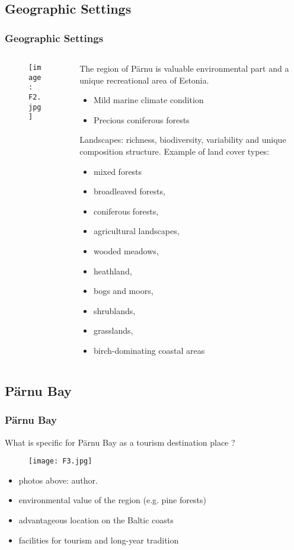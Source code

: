 \documentclass[pdflatex,compress,8pt,
	xcolor={dvipsnames,dvipsnames,svgnames,x11names,table},
]{beamer}
\begin{document}
\subsection{Geographic Settings}
\begin{frame}\frametitle{Geographic Settings}
\begin{minipage}[0.4\textheight]{\textwidth}
\begin{columns}[T]
\begin{column}{0.4\textwidth}
\begin{figure}[H]
	\centering
		\texttt{[image: F2.jpg]}
\end{figure}
\end{column}
%
\begin{column}{0.6\textwidth}
The region of Pärnu is valuable environmental part and a \\
unique recreational area of Estonia. 
\begin{itemize}
	\item Mild marine climate condition
	\item Precious coniferous forests
\end{itemize}
Landscapes: richness, biodiversity, variability and unique composition structure.
Example of land cover types:
\begin{itemize}
	\item mixed forests
	\item broadleaved forests,
	\item coniferous forests,
	\item agricultural landscapes, 
	\item wooded meadows,
	\item heathland, 
	\item bogs and moors,
	\item shrublands,
	\item grasslands, 
	\item birch-dominating coastal areas
\end{itemize}
\end{column}
\end{columns}
\end{minipage}
\end{frame} 

\subsection{Pärnu Bay}
\begin{frame}\frametitle{Pärnu Bay}
 What is specific for Pärnu Bay as a tourism destination place ?
\begin{figure}[H]
	\centering
		\texttt{[image: F3.jpg]}
\end{figure}
\begin{itemize}
	\item photos above: author.
	\item environmental value of the region (e.g. pine forests) 
	\item advantageous location on the Baltic coasts
	\item facilities for tourism and long-year tradition
\end{itemize}
\end{frame} 
         
\end{document}
